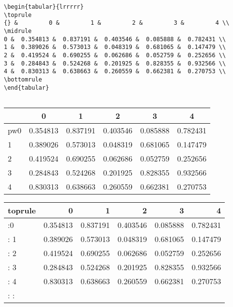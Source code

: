 \documentclass[11pt]{article}
\begin{document}
\begin{verbatim}
\begin{tabular}{lrrrrr}
\toprule
{} &         0 &         1 &         2 &         3 &         4 \\
\midrule
0 &  0.354813 &  0.837191 &  0.403546 &  0.085888 &  0.782431 \\
1 &  0.389026 &  0.573013 &  0.048319 &  0.681065 &  0.147479 \\
2 &  0.419524 &  0.690255 &  0.062686 &  0.052759 &  0.252656 \\
3 &  0.284843 &  0.524268 &  0.201925 &  0.828355 &  0.932566 \\
4 &  0.830313 &  0.638663 &  0.260559 &  0.662381 &  0.270753 \\
\bottomrule
\end{tabular}


\end{verbatim}


\begin{tabular}{l|c|c|c|c|c}
\toprule
{} &         0 &         1 &         2 &         3 &         4 \\
\hline
pw0 &  0.354813 &  0.837191 &  0.403546 &  0.085888 &  0.782431 \\
1 &  0.389026 &  0.573013 &  0.048319 &  0.681065 &  0.147479 \\
2 &  0.419524 &  0.690255 &  0.062686 &  0.052759 &  0.252656 \\
3 &  0.284843 &  0.524268 &  0.201925 &  0.828355 &  0.932566 \\
4 &  0.830313 &  0.638663 &  0.260559 &  0.662381 &  0.270753 \\
\bottomrule
\end{tabular}

\begin{tabular}{lrrrrr}
toprule
{} &         0 &         1 &         2 &         3 &         4 \\
\midrule
:0 &  0.354813 &  0.837191 &  0.403546 &  0.085888 &  0.782431 \\
: 1 &  0.389026 &  0.573013 &  0.048319 &  0.681065 &  0.147479 \\
: 2 &  0.419524 &  0.690255 &  0.062686 &  0.052759 &  0.252656 \\
: 3 &  0.284843 &  0.524268 &  0.201925 &  0.828355 &  0.932566 \\
: 4 &  0.830313 &  0.638663 &  0.260559 &  0.662381 &  0.270753 \\
: \bottomrule
: \end{tabular}
\end{document}
